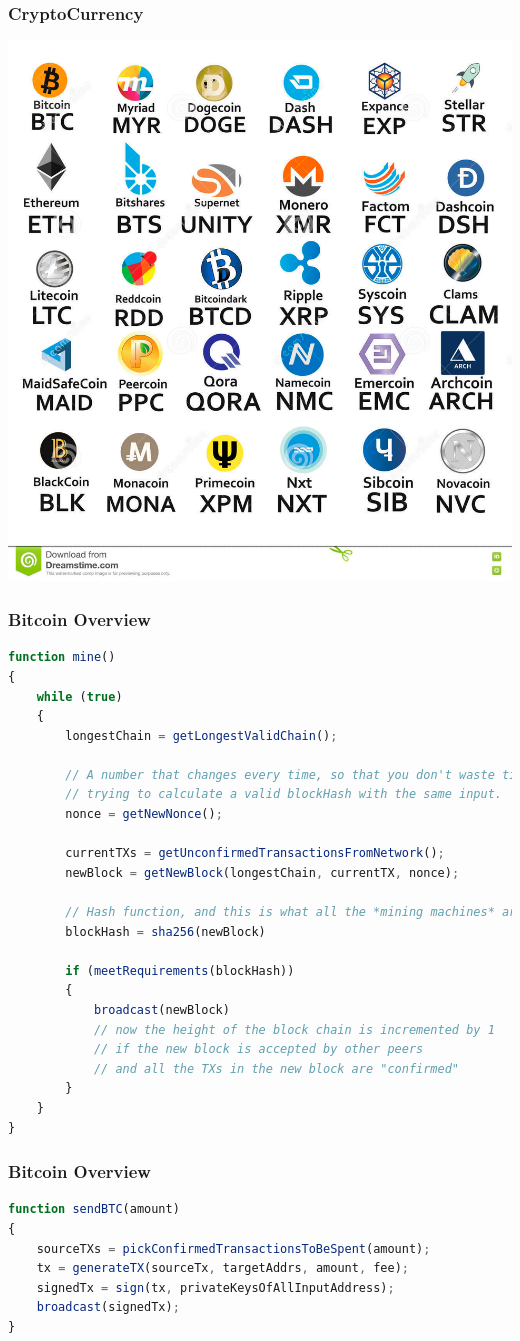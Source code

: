 \begin{frame}
    \frametitle{CryptoCurrency}
    \includegraphics[scale=0.16]{./figures/cryptocurrency.png}
\end{frame}

\begin{frame}[fragile]
    \frametitle{Bitcoin Overview}
    \begin{lstlisting}[language=JavaScript]
function mine()
{
    while (true)
    {
        longestChain = getLongestValidChain();

        // A number that changes every time, so that you don't waste time
        // trying to calculate a valid blockHash with the same input.
        nonce = getNewNonce();

        currentTXs = getUnconfirmedTransactionsFromNetwork();
        newBlock = getNewBlock(longestChain, currentTX, nonce);

        // Hash function, and this is what all the *mining machines* are doing
        blockHash = sha256(newBlock)

        if (meetRequirements(blockHash))
        {
            broadcast(newBlock)
            // now the height of the block chain is incremented by 1
            // if the new block is accepted by other peers
            // and all the TXs in the new block are "confirmed"
        }
    }
}
    \end{lstlisting}
\end{frame}

\begin{frame}[fragile]
    \frametitle{Bitcoin Overview}
    \begin{lstlisting}[language=JavaScript]
function sendBTC(amount)
{
    sourceTXs = pickConfirmedTransactionsToBeSpent(amount);
    tx = generateTX(sourceTx, targetAddrs, amount, fee);
    signedTx = sign(tx, privateKeysOfAllInputAddress);
    broadcast(signedTx);
}
    \end{lstlisting}
\end{frame}

